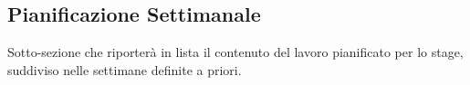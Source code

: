 \subsection{Pianificazione Settimanale}

Sotto-sezione che riporterà in lista il contenuto del lavoro pianificato per lo stage, suddiviso nelle settimane definite a priori.